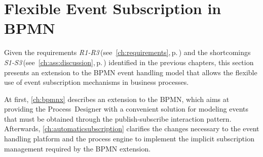 \chapter{Flexible Event Subscription in BPMN}\label{ch:flexibleeventsubscription}

Given the requirements \textit{R1-R3}\,(see~\autoref{ch:requirements},\,p.\,\pageref{ch:requirements}) and the shortcomings \textit{S1-S3}\,(see~\autoref{ch:ass:discussion},\,p.\,\pageref{ch:ass:discussion}) identified in the previous chapters, this section presents an extension to the BPMN event handling model that allows the flexible use of event subscription mechanisms in business processes.

At first, \ref{ch:bpmnx} describes an extension to the \acf{BPMN}, which aims at providing the Process~Designer with a convenient solution for modeling events that must be obtained through the publish-subscribe interaction pattern.
Afterwards, \autoref{ch:automaticsubscription} clarifies the changes necessary to the event handling platform and the process engine to implement the implicit subscription management required by the BPMN extension.


\label{fig:concept-modules}



